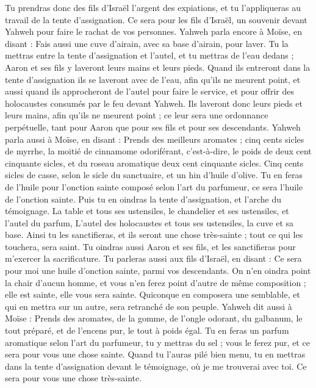 \begin{multicols}{2}
Tu prendras donc des fils d'Israël l'argent des expiations, et tu l'appliqueras au travail de la tente d'assignation. Ce sera pour les fils d'Israël, un souvenir devant Yahweh pour faire le rachat de vos personnes.
Yahweh parla encore à Moïse, en disant :
Fais aussi une cuve d'airain, avec sa base d'airain, pour laver. Tu la mettras entre la tente d'assignation et l'autel, et tu mettras de l'eau dedans ;
Aaron et ses fils y laveront leurs mains et leurs pieds.
Quand ils entreront dans la tente d'assignation ils se laveront avec de l'eau, afin qu'ils ne meurent point, et aussi quand ils approcheront de l'autel pour faire le service, et pour offrir des holocaustes consumés par le feu devant Yahweh.
Ils laveront donc leurs pieds et leurs mains, afin qu'ils ne meurent point ; ce leur sera une ordonnance perpétuelle, tant pour Aaron que pour ses fils et pour ses descendants.
Yahweh parla aussi à Moïse, en disant :
Prends des meilleurs aromates ; cinq cents sicles de myrrhe, la moitié de cinnamome odoriférant, c'est-à-dire, le poids de deux cent cinquante sicles, et du roseau aromatique deux cent cinquante sicles.
Cinq cents sicles de casse, selon le sicle du sanctuaire, et un hin d'huile d'olive.
Tu en feras de l'huile pour l'onction sainte composé selon l’art du parfumeur, ce sera l'huile de l'onction sainte.
Puis tu en oindras la tente d'assignation, et l'arche du témoignage.
La table et tous ses ustensiles, le chandelier et ses ustensiles, et l'autel du parfum,
L'autel des holocaustes et tous ses ustensiles, la cuve et sa base.
Ainsi tu les sanctifieras, et ils seront une chose très-sainte ; tout ce qui les touchera, sera saint.
Tu oindras aussi Aaron et ses fils, et les sanctifieras pour m'exercer la sacrificature.
Tu parleras aussi aux fils d'Israël, en disant : Ce sera pour moi une huile d’onction sainte, parmi vos descendants.
On n'en oindra point la chair d'aucun homme, et vous n'en ferez point d'autre de même composition ; elle est sainte, elle vous sera sainte.
Quiconque en composera une semblable, et qui en mettra sur un autre, sera retranché de son peuple.
Yahweh dit aussi à Moïse : Prends des aromates, de la gomme, de l’ongle odorant, du galbanum, le tout préparé, et de l'encens pur, le tout à poids égal.
Tu en feras un parfum aromatique selon l'art du parfumeur, tu y mettras du sel ; vous le ferez pur, et ce sera pour vous une chose sainte.
Quand tu l'auras pilé bien menu, tu en mettras dans la tente d'assignation devant le témoignage, où je me trouverai avec toi. Ce sera pour vous une chose très-sainte.

\end{multicols}
